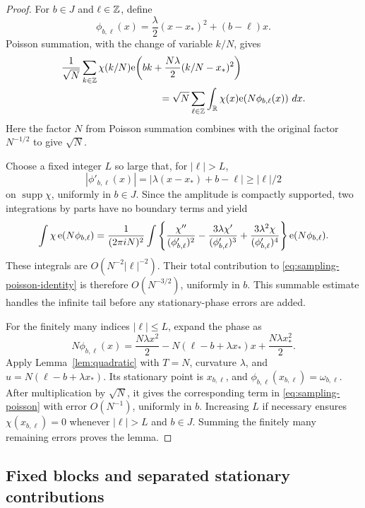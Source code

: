 \begin{proof}
For $b\in J$ and $\ell\in\mathbb Z$, define
\[
 \phi_{b,\ell}(x)
   =\frac{\lambda}{2}(x-x_*)^2+(b-\ell)x.
\]
Poisson summation, with the change of variable $k/N$, gives
\begin{align}
 &\frac1{\sqrt N}\sum_{k\in\Z}\chi(k/N)
   \e\!\left(bk+\frac{N\lambda}{2}(k/N-x_*)^2\right)
 \notag\\
 &\hspace{35mm}=
 \sqrt N\sum_{\ell\in\Z}
       \int_{\R}\chi(x)\e\!\left(N\phi_{b,\ell}(x)\right)\,dx.
 \label{eq:sampling-poisson-identity}
\end{align}
Here the factor $N$ from Poisson summation combines with the original
factor $N^{-1/2}$ to give $\sqrt N$.

Choose a fixed integer $L$ so large that, for $|\ell|>L$,
\[
 |\phi'_{b,\ell}(x)|
   =|\lambda(x-x_*)+b-\ell|\ge |\ell|/2
\]
on $\operatorname{supp}\chi$, uniformly in $b\in J$.  Since the amplitude
is compactly supported, two integrations by parts have no boundary terms
and yield
\begin{align*}
 \int\chi\,\mathrm e(N\phi_{b,\ell})
  =\frac1{(2\pi iN)^2}\int
  \left\{
   \frac{\chi''}{(\phi'_{b,\ell})^2}
   -\frac{3\lambda\chi'}{(\phi'_{b,\ell})^3}
   +\frac{3\lambda^2\chi}{(\phi'_{b,\ell})^4}
  \right\}\mathrm e(N\phi_{b,\ell}).
\end{align*}
These integrals are $O(N^{-2}|\ell|^{-2})$.  Their total contribution to
\eqref{eq:sampling-poisson-identity} is therefore $O(N^{-3/2})$, uniformly
in $b$.  This summable estimate handles the infinite tail before any
stationary-phase errors are added.

For the finitely many indices $|\ell|\le L$, expand the phase as
\[
 N\phi_{b,\ell}(x)
 =\frac{N\lambda x^2}{2}
   -N(\ell-b+\lambda x_*)x+\frac{N\lambda x_*^2}{2}.
\]
Apply Lemma~\ref{lem:quadratic} with $T=N$, curvature $\lambda$, and
$u=N(\ell-b+\lambda x_*)$.  Its stationary point is $x_{b,\ell}$, and
$\phi_{b,\ell}(x_{b,\ell})=\omega_{b,\ell}$.  After multiplication by
$\sqrt N$, it gives the corresponding term in
\eqref{eq:sampling-poisson} with error $O(N^{-1})$, uniformly in $b$.
Increasing $L$ if necessary ensures
$\chi(x_{b,\ell})=0$ whenever $|\ell|>L$ and $b\in J$.
Summing the finitely many remaining errors proves the lemma.
\end{proof}

\subsection{Fixed blocks and separated stationary contributions}

